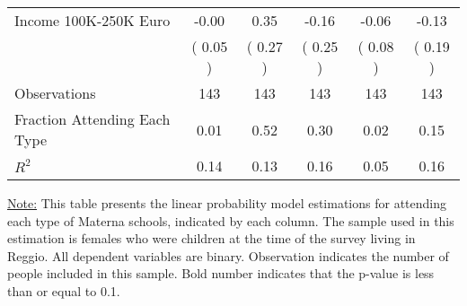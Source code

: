 \begin{table}[H]
{\begin{tabular}{lccccc}
\quad Income 100K-250K Euro &     -0.00 &      0.35 &     -0.16 &     -0.06 &     -0.13 \\
\quad  & (     0.05 ) & (     0.27 )  & (     0.25 )  & (     0.08 ) & (     0.19 ) \\
\midrule
Observations & 143 & 143 & 143 & 143 & 143 \\
Fraction Attending Each Type &      0.01 &      0.52 &      0.30 &      0.02 &      0.15 \\
\midrule
$ R^2$ &      0.14 &      0.13 &      0.16 &      0.05 &      0.16 \\
\bottomrule
\end{tabular}}
\end{table}
\begin{footnotesize}
\noindent\underline{Note:} This table presents the linear probability model estimations for attending each type of Materna schools, indicated by each column. The sample used in this estimation is females who were children at the time of the survey living in Reggio. All dependent variables are binary. Observation indicates the number of people included in this sample. Bold number indicates that the p-value is less than or equal to 0.1.
\end{footnotesize}
